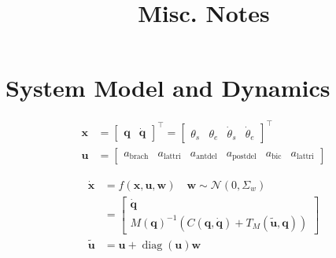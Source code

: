 \documentclass[11pt]{article}
\title{Misc. Notes}
\DeclareMathOperator{\diag}{\operatorname{diag}}%
\begin{document}
\maketitle

\section{System Model and Dynamics}
\begin{align}
    \mathbf{x} &= \begin{bmatrix}
        \mathbf{q} &
        \dot{\mathbf{q}}
    \end{bmatrix}^\top = \begin{bmatrix}
        \theta_s &
        \theta_e &
        \dot{\theta}_s &
        \dot{\theta}_e
    \end{bmatrix}^\top \\
    \mathbf{u} &= \begin{bmatrix}
        a_{\text{brach}} & a_{\text{lattri}} & a_{\text{antdel}} & a_{\text{postdel}} & a_{\text{bic}} & a_{\text{lattri}}
    \end{bmatrix}
\end{align}

\begin{align}
    \dot{\mathbf{x}} &= f(\mathbf{x}, \mathbf{u}, \mathbf{w}) \quad \mathbf{w} \sim \mathcal{N}(0, \Sigma_w) \\
    &= \begin{bmatrix}
        \dot{\mathbf{q}} \\
        M(\mathbf{q})^{-1} \left(C(\mathbf{q}, \dot{\mathbf{q}}) + T_M(\tilde{\mathbf{u}}, \mathbf{q})\right)
    \end{bmatrix} \\
    \tilde{\mathbf{u}} &= \mathbf{u} + \diag(\mathbf{u})\mathbf{w}
\end{align}
\end{document}
